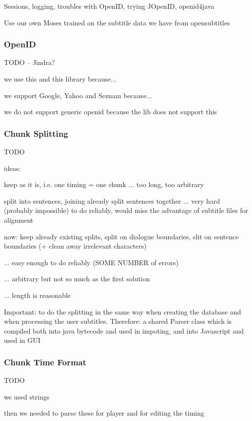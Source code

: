 Sessions, logging, troubles with OpenID, trying JOpenID, openid4java 

Use our own Moses trained on the subtitle data we have from opensubtitles

\subsubsection{OpenID}

TODO -- Jindra?

we use this and this library because...

we support Google, Yahoo and Seznam because...

we do not support generic openid because the lib does not support this

\subsubsection{Chunk Splitting}

TODO

ideas:

keep as it is, i.e. one timing = one chunk ... too long, too arbitrary

split into sentences, joining already split sentences together ... very hard (probably impossible) to do reliably, would miss the advantage of subtitle files for alignment

now: keep already existing splits, split on dialogue boundaries, slit on sentence boundaries (+ clean away irrelevant characters)

... easy enough to do reliably (SOME NUMBER of errors)

... arbitrary but not so much as the first solution

... length is reasonable

Important: to do the splitting in the same way when creating the database and when processing the user subtitles.
Therefore: a shared Parser class which is compiled both into java bytecode and used in impoting, and into Javascript and used in GUI

\subsubsection{Chunk Time Format}

TODO

we used strings

then we needed to parse these for player and for editing the timing

